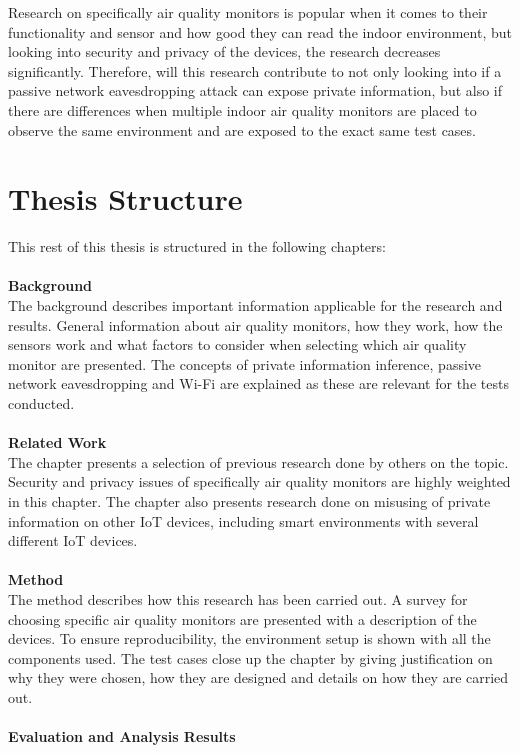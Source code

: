 Research on specifically air quality monitors is popular when it comes to their functionality and sensor and how good they can read the indoor environment, but looking into security and privacy of the devices, the research decreases significantly. Therefore, will this research contribute to not only looking into if a passive network eavesdropping attack can expose private information, but also if there are differences when multiple indoor air quality monitors are placed to observe the same environment and are exposed to the exact same test cases. 

\section{Thesis Structure}
This rest of this thesis is structured in the following chapters:\\\\
\textbf{Background}
\\
The background describes important information applicable for the research and results. General information about air quality monitors, how they work, how the sensors work and what factors to consider when selecting which air quality monitor are presented. The concepts of private information inference, passive network eavesdropping and \gls{Wi-Fi} are explained as these are relevant for the tests conducted. 
\\\\
\textbf{Related Work}
\\
The chapter presents a selection of previous research done by others on the topic. Security and privacy issues of specifically air quality monitors are highly weighted in this chapter. The chapter also presents research done on misusing of private information on other \gls{IoT} devices, including smart environments with several different \gls{IoT} devices. 
\\\\
\textbf{Method}
\\
The method describes how this research has been carried out. A survey for choosing specific air quality monitors are presented with a description of the devices. To ensure reproducibility, the environment setup is shown with all the components used. The test cases close up the chapter by giving justification on why they were chosen, how they are designed and details on how they are carried out. 
\\\\
\textbf{Evaluation and Analysis Results}
\\
